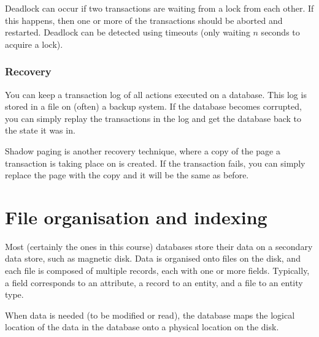 Deadlock can occur if two transactions are waiting from a lock from each other.
If this happens, then one or more of the transactions should be aborted and
restarted. Deadlock can be detected using timeouts (only waiting $n$ seconds to
acquire a lock).

\subsubsection*{Recovery}

You can keep a transaction log of all actions executed on a database. This log
is stored in a file on (often) a backup system. If the database becomes
corrupted, you can simply replay the transactions in the log and get the
database back to the state it was in.

Shadow paging is another recovery technique, where a copy of the page a
transaction is taking place on is created. If the transaction fails, you can
simply replace the page with the copy and it will be the same as before.

\section{File organisation and indexing}

Most (certainly the ones in this course) databases store their data on a
secondary data store, such as magnetic disk. Data is organised onto files on the
disk, and each file is composed of multiple records, each with one or more
fields. Typically, a field corresponds to an attribute, a record to an entity,
and a file to an entity type.

When data is needed (to be modified or read), the database maps the logical
location of the data in the database onto a physical location on the disk.
